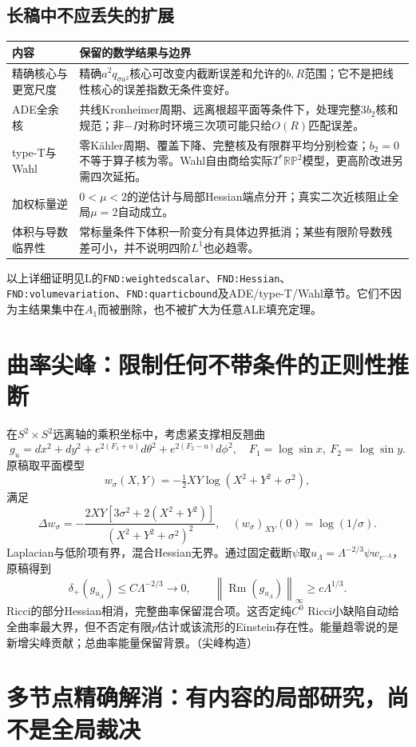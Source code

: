 \documentclass[UTF8,fontset=fandol,zihao=-4]{ctexart}
\theoremstyle{research}
\DeclareMathOperator{\Rm}{Rm}
\newcommand{\norm}[1]{\left\|#1\right\|}
\numberwithin{equation}{section}
\begin{document}
\subsection{长稿中不应丢失的扩展}
\begin{longtable}{P{.25\textwidth}P{.67\textwidth}}
\toprule 内容 & 保留的数学结果与边界\\\midrule\endhead
精确核心与更宽尺度 & 精确$a^2q_{\sigma a^2}$核心可改变内截断误差和允许的$b,R$范围；它不是把线性核心的误差指数无条件变好。\\
ADE全余核 & 共线Kronheimer周期、远离根超平面等条件下，处理完整$3b_2$核和规范；非$-I$对称时环境三次项可能只给$O(R)$匹配误差。\\
type-T与Wahl & 零Kähler周期、覆盖下降、完整核及有限群平均分别检查；$b_2=0$不等于算子核为零。Wahl自由商给实际$T^*\mathbb{RP}^2$模型，更高阶改进另需四次延拓。\\
加权标量逆 & $0<\mu<2$的逆估计与局部Hessian端点分开；真实二次近核阻止全局$\mu=2$自动成立。\\
体积与导数临界性 & 常标量条件下体积一阶变分有具体边界抵消；某些有限阶导数残差可小，并不说明四阶$L^1$也必趋零。\\\bottomrule
\end{longtable}
以上详细证明见L的\texttt{FND:weightedscalar}、\texttt{FND:Hessian}、\texttt{FND:volumevariation}、\texttt{FND:quarticbound}及ADE/type-T/Wahl章节。它们不因为主结果集中在$A_1$而被删除，也不被扩大为任意ALE填充定理。

\section{曲率尖峰：限制任何不带条件的正则性推断}
在$S^2\times S^2$远离轴的乘积坐标中，考虑紧支撑相反翘曲
\[
g_u=dx^2+dy^2+e^{2(F_1+u)}d\theta^2+e^{2(F_2-u)}d\phi^2,
\quad F_1=\log\sin x,\ F_2=\log\sin y.
\]
原稿取平面模型
\[
w_\sigma(X,Y)=-\tfrac12XY\log(X^2+Y^2+\sigma^2),
\]
满足
\[
\Delta w_\sigma=-\frac{2XY[3\sigma^2+2(X^2+Y^2)]}{(X^2+Y^2+\sigma^2)^2},
\quad (w_\sigma)_{XY}(0)=\log(1/\sigma).
\]
Laplacian与低阶项有界，混合Hessian无界。通过固定截断$\psi$取$u_\Lambda=\Lambda^{-2/3}\psi w_{e^{-\Lambda}}$，原稿得到
\[
\delta_+(g_{u_\Lambda})\le C\Lambda^{-2/3}\to0,
\qquad\norm{\Rm(g_{u_\Lambda})}_\infty\ge c\Lambda^{1/3}.
\]
Ricci的部分Hessian相消，完整曲率保留混合项。这否定纯$C^0$ Ricci小缺陷自动给全曲率最大界，但不否定有限$p$估计或该流形的Einstein存在性。能量趋零说的是新增尖峰贡献；总曲率能量保留背景。\cite{C}（尖峰构造）

\section{多节点精确解消：有内容的局部研究，尚不是全局裁决}
\end{document}
